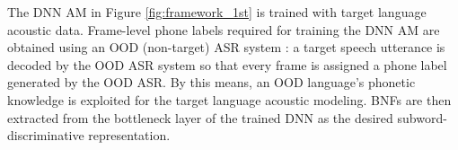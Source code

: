 \documentclass[a4paper]{article}
\begin{document}

The  DNN AM in Figure \ref{fig:framework_1st}
is trained with target language acoustic data. %
Frame-level phone labels required for training the DNN AM are obtained using an OOD (non-target)  ASR system  \cite{feng2020unsupervised}: a  target speech utterance is decoded by the OOD ASR system so that every frame is assigned  a  phone label generated by the OOD ASR. 
By this means, an OOD language's phonetic knowledge is exploited for the target language acoustic modeling.
BNFs are then extracted from the bottleneck layer of the trained DNN as the desired subword-discriminative representation.

\end{document}
